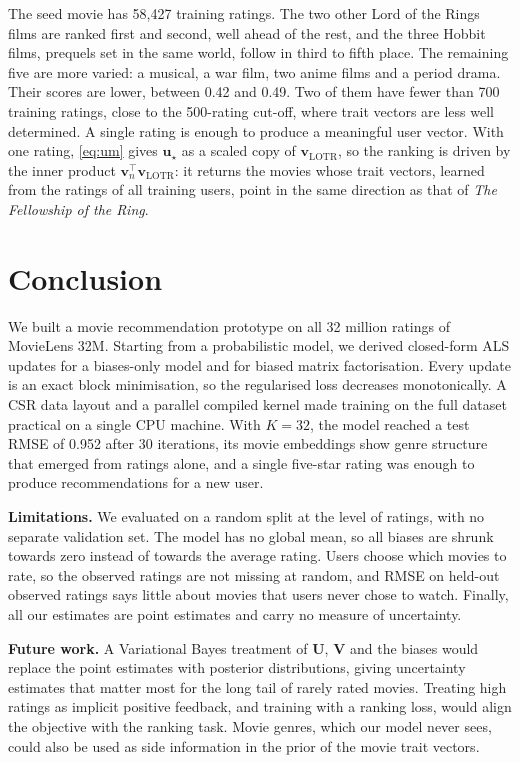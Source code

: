 \documentclass{article}
\theoremstyle{plain}
\theoremstyle{definition}
\theoremstyle{remark}
\begin{document}
The seed movie has 58{,}427 training ratings. The two other Lord of the
Rings films are ranked first and second, well ahead of the rest, and the
three Hobbit films, prequels set in the same world, follow in third to fifth place. The remaining five are more
varied: a musical, a war film, two anime films and a period drama. Their
scores are lower, between 0.42 and 0.49. Two of them have fewer than 700
training ratings, close to the 500-rating cut-off, where trait vectors are
less well determined.
A single rating is enough to produce a meaningful user vector. With one
rating, \cref{eq:um} gives $\mathbf{u}_\star$ as a scaled copy of
$\mathbf{v}_{\text{LOTR}}$, so the ranking is driven by the inner product
$\mathbf{v}_n^\top \mathbf{v}_{\text{LOTR}}$: it returns the movies whose
trait vectors, learned from the ratings of all training users, point in the
same direction as that of \emph{The Fellowship of the Ring}.

\section{Conclusion}
\label{sec:conclusion}

We built a movie recommendation prototype on all 32 million ratings of
MovieLens 32M. Starting from a probabilistic model, we derived closed-form
ALS updates for a biases-only model and for biased matrix factorisation.
Every update is an exact block minimisation, so the regularised loss
decreases monotonically. A CSR data layout and a parallel compiled kernel
made training on the full dataset practical on a single CPU machine. With
$K = 32$, the model reached a test RMSE of 0.952 after 30 iterations, its movie
embeddings show genre structure that emerged from ratings alone, and a
single five-star rating was enough to produce recommendations for a new
user.

\textbf{Limitations.}
We evaluated on a random split at the level of ratings, with no separate
validation set. The model has no global mean, so all biases are shrunk
towards zero instead of towards the average rating. Users choose which
movies to rate, so the observed ratings are not missing at random, and
RMSE on held-out observed ratings says little about movies that users never
chose to watch. Finally, all our estimates are point estimates and carry no
measure of uncertainty.

\textbf{Future work.}
A Variational Bayes treatment of $\mathbf{U}$, $\mathbf{V}$ and the biases
would replace the point estimates with posterior distributions, giving
uncertainty estimates that matter most for the long tail of rarely rated
movies. Treating high ratings as implicit positive feedback, and training
with a ranking loss, would align the objective with the ranking task.
Movie genres, which our model never sees, could also be used as side
information in the prior of the movie trait vectors.
\end{document}
